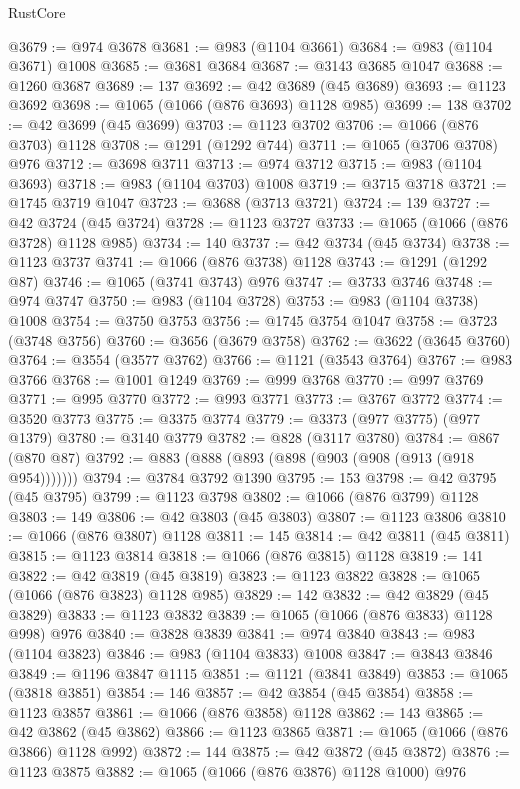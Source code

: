 \begin{lexlean}{RustCore}
\begin{coremodule}
@3679 := @974 @3678
@3681 := @983 (@1104 @3661)
@3684 := @983 (@1104 @3671) @1008
@3685 := @3681 @3684
@3687 := @3143 @3685 @1047
@3688 := @1260 @3687
@3689 := 137
@3692 := @42 @3689 (@45 @3689)
@3693 := @1123 @3692
@3698 := @1065 (@1066 (@876 @3693) @1128 @985)
@3699 := 138
@3702 := @42 @3699 (@45 @3699)
@3703 := @1123 @3702
@3706 := @1066 (@876 @3703) @1128
@3708 := @1291 (@1292 @744)
@3711 := @1065 (@3706 @3708) @976
@3712 := @3698 @3711
@3713 := @974 @3712
@3715 := @983 (@1104 @3693)
@3718 := @983 (@1104 @3703) @1008
@3719 := @3715 @3718
@3721 := @1745 @3719 @1047
@3723 := @3688 (@3713 @3721)
@3724 := 139
@3727 := @42 @3724 (@45 @3724)
@3728 := @1123 @3727
@3733 := @1065 (@1066 (@876 @3728) @1128 @985)
@3734 := 140
@3737 := @42 @3734 (@45 @3734)
@3738 := @1123 @3737
@3741 := @1066 (@876 @3738) @1128
@3743 := @1291 (@1292 @87)
@3746 := @1065 (@3741 @3743) @976
@3747 := @3733 @3746
@3748 := @974 @3747
@3750 := @983 (@1104 @3728)
@3753 := @983 (@1104 @3738) @1008
@3754 := @3750 @3753
@3756 := @1745 @3754 @1047
@3758 := @3723 (@3748 @3756)
@3760 := @3656 (@3679 @3758)
@3762 := @3622 (@3645 @3760)
@3764 := @3554 (@3577 @3762)
@3766 := @1121 (@3543 @3764)
@3767 := @983 @3766
@3768 := @1001 @1249
@3769 := @999 @3768
@3770 := @997 @3769
@3771 := @995 @3770
@3772 := @993 @3771
@3773 := @3767 @3772
@3774 := @3520 @3773
@3775 := @3375 @3774
@3779 := @3373 (@977 @3775) (@977 @1379)
@3780 := @3140 @3779
@3782 := @828 (@3117 @3780)
@3784 := @867 (@870 @87)
@3792 := @883 (@888 (@893 (@898 (@903 (@908 (@913 (@918 @954)))))))
@3794 := @3784 @3792 @1390
@3795 := 153
@3798 := @42 @3795 (@45 @3795)
@3799 := @1123 @3798
@3802 := @1066 (@876 @3799) @1128
@3803 := 149
@3806 := @42 @3803 (@45 @3803)
@3807 := @1123 @3806
@3810 := @1066 (@876 @3807) @1128
@3811 := 145
@3814 := @42 @3811 (@45 @3811)
@3815 := @1123 @3814
@3818 := @1066 (@876 @3815) @1128
@3819 := 141
@3822 := @42 @3819 (@45 @3819)
@3823 := @1123 @3822
@3828 := @1065 (@1066 (@876 @3823) @1128 @985)
@3829 := 142
@3832 := @42 @3829 (@45 @3829)
@3833 := @1123 @3832
@3839 := @1065 (@1066 (@876 @3833) @1128 @998) @976
@3840 := @3828 @3839
@3841 := @974 @3840
@3843 := @983 (@1104 @3823)
@3846 := @983 (@1104 @3833) @1008
@3847 := @3843 @3846
@3849 := @1196 @3847 @1115
@3851 := @1121 (@3841 @3849)
@3853 := @1065 (@3818 @3851)
@3854 := 146
@3857 := @42 @3854 (@45 @3854)
@3858 := @1123 @3857
@3861 := @1066 (@876 @3858) @1128
@3862 := 143
@3865 := @42 @3862 (@45 @3862)
@3866 := @1123 @3865
@3871 := @1065 (@1066 (@876 @3866) @1128 @992)
@3872 := 144
@3875 := @42 @3872 (@45 @3872)
@3876 := @1123 @3875
@3882 := @1065 (@1066 (@876 @3876) @1128 @1000) @976

\end{coremodule}
\end{lexlean}
